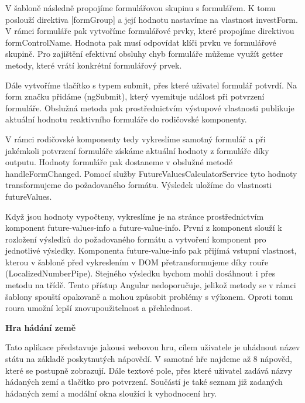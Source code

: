 V šabloně následně propojíme formulářovou skupinu s formulářem. K tomu poslouží direktiva [formGroup] a její hodnotu nastavíme na vlastnost investForm. 
V rámci formuláře pak vytvoříme formulářové prvky, které propojíme direktivou formControlName. Hodnota pak musí odpovídat klíči prvku ve formulářové skupině. 
Pro zajištění efektivní obsluhy chyb formuláře můžeme využít getter metody, které vrátí konkrétní formulářový prvek.

Dále vytvoříme tlačítko s typem submit, přes které uživatel formulář potvrdí. Na form značku přidáme (ngSubmit), který vyemituje událost při potvrzení formuláře. 
Obslužná metoda pak prostřednictvím výstupové vlastnosti publikuje aktuální hodnotu reaktivního formuláře do rodičovské komponenty.

V rámci rodičovské komponenty tedy vykreslíme samotný formulář a při jakémkoli potvrzení formuláře získáme aktuální hodnoty z formuláře díky outputu. 
Hodnoty formuláře pak dostaneme v obslužné metodě handleFormChanged. Pomocí služby FutureValuesCalculatorService tyto hodnoty transformujeme do požadovaného formátu. 
Výsledek uložíme do vlastnosti futureValues. 

Když jsou hodnoty vypočteny, vykreslíme je na stránce prostřednictvím komponent future-values-info a future-value-info. 
První z komponent slouží k rozložení výsledků do požadovaného formátu a vytvoření komponent pro jednotlivé výsledky. 
Komponenta future-value-info pak přijímá vstupní vlastnost, kterou v šabloně před vykreslením v DOM přetransformujeme díky rouře (LocalizedNumberPipe). 
Stejného výsledku bychom mohli dosáhnout i přes metodu na třídě. Tento přístup Angular nedoporučuje, jelikož metody se v rámci šablony spouští opakovaně a mohou způsobit problémy s výkonem. 
Oproti tomu roura umožní lepší znovupoužitelnost a přehlednost.

\begin{flushleft}
  \textbf{Hra hádání země}
\end{flushleft}

Tato aplikace představuje jakousi webovou hru, cílem uživatele je uhádnout název státu na základě poskytnutých nápovědí. 
V samotné hře najdeme až 8 nápověd, které se postupně zobrazují. Dále textové pole, přes které uživatel zadává názvy hádaných zemí a tlačítko pro potvrzení. 
Součástí je také seznam již zadaných hádaných zemí a modální okna sloužící k vyhodnocení hry.

